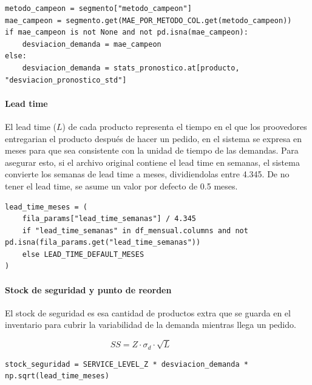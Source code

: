 \label{lst:calcular_tabla_reorden}

\begin{verbatim}
metodo_campeon = segmento["metodo_campeon"]
mae_campeon = segmento.get(MAE_POR_METODO_COL.get(metodo_campeon))
if mae_campeon is not None and not pd.isna(mae_campeon):
    desviacion_demanda = mae_campeon
else:
    desviacion_demanda = stats_pronostico.at[producto, "desviacion_pronostico_std"]
\end{verbatim}

\paragraph{Lead time}

El lead time ($L$) de cada producto representa el tiempo en el que los proovedores entregarian el producto después de hacer un pedido, en el sistema se expresa en meses para que sea consistente con la unidad de tiempo de las demandas. Para asegurar esto, si el archivo original contiene el lead time en semanas, el sistema convierte los semanas de lead time a meses, dividiendolas entre 4.345. De no tener el lead time, se asume un valor por defecto de 0.5 meses.

\label{lst:lead_time_meses}
\begin{verbatim}
lead_time_meses = (
    fila_params["lead_time_semanas"] / 4.345
    if "lead_time_semanas" in df_mensual.columns and not pd.isna(fila_params.get("lead_time_semanas"))
    else LEAD_TIME_DEFAULT_MESES
)
\end{verbatim}

\paragraph{Stock de seguridad y punto de reorden}

El stock de seguridad es esa cantidad de productos extra que se guarda en el inventario para cubrir la variabilidad de la demanda mientras llega un pedido. 

\[
SS = Z \cdot \sigma_d \cdot \sqrt{L}
\qquad\qquad
\]

\label{lst:stock_seguridad_normal}
\begin{verbatim}
stock_seguridad = SERVICE_LEVEL_Z * desviacion_demanda * np.sqrt(lead_time_meses)
\end{verbatim}

